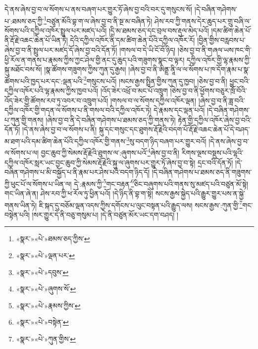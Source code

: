 དེ་ནས་ཞེས་བྱ་བ་ལ་སོགས་པ་ནས་བཞག་པར་གྱུར་ཏོ་ཞེས་བྱ་བའི་བར་དུ་གསུངས་སོ། །དེ་བཞིན་གཤེགས་པ་:ཐམས་ཅད་ཀྱི་\footnote{«སྣར་»«པེ་»ཐམས་ཅད་ཀྱིས་}བཙུན་མོའི་བྷ་ག་ལ་ཞེས་བྱ་བ་ནི་སྔ་མ་བཞིན་ཏེ། ཤེས་རབ་ཀྱི་གནས་དེར་ཆུད་པར་གྲུ་བཞི་ལ་སོགས་པའི་དཀྱིལ་འཁོར་སྤྲུལ་པར་མཛད་པའོ། །དྲི་མ་ཐམས་ཅད་དང་བྲལ་བས་རྡུལ་མེད་པའོ། །དམ་ཚིག་ཆེན་པོ་ནི་རྡོ་རྗེ་འཆང་ཆེན་པོ་ཡིན་ཏེ། དེའི་དཀྱིལ་འཁོར་ནི་དམ་ཚིག་ཆེན་པོའི་དཀྱིལ་འཁོར་རོ། །བྱིན་གྱིས་བརླབས་པ་ཞེས་བྱ་བ་ནི་སྤྲུལ་པར་མཛད་དོ་ཞེས་བྱ་བའི་དོན་ཏོ། །གསལ་བ་དེ་ཡི་ངོ་བོ་ཉིད། །ཅེས་བྱ་བ་ནི་གཞལ་ཡས་ཁང་གི་ཕྱི་རོལ་ན་གནས་པ་རྣམས་ཀྱིས་ཀྱང་ཤེལ་གྱི་ནང་དུ་ཆུད་པའི་གཟུགས་སྣང་བ་ལྟར། དཀྱིལ་འཁོར་གྱི་ལྷ་རྣམས་ཀྱི་སྐུ་མཐོང་བས་སོ། །སྣ་ཚོགས་གཟུགས་ཀྱིས་ཀུན་དུ་རྒྱས། །ཞེས་བྱ་བ་ནི་ཨིནྡྲ་ནཱི་ལ་ལ་སོགས་པ་ཁ་དོག་རྣམ་པ་སྣ་ཚོགས་པའི་ཁྱད་པར་དང་:ལྡན་པའི་\footnote{«སྣར་»«པེ་»ལྡན་པར་}གསུངས་པའོ། །སངས་རྒྱས་སྤྲིན་གྱིས་ཀུན་དུ་ཁྱབ། །ཅེས་བྱ་བ་ནི། ཕྱུང་བའི་དཀྱིལ་འཁོར་པའི་ལྷ་རྣམས་ཀྱིས་ཁྱབ་པའོ། །འོད་ཟེར་འཕྲོ་བ་མང་པོ་འཁྲུག །ཅེས་བྱ་བ་ནི་ཕྱོགས་བཅུར་ཁྲོ་བོའི་འོད་ཟེར་གྱི་ཚོགས་རབ་ཏུ་འབར་བ་འཁྲུག་པའོ། །གསལ་བ་ལ་སོགས་དཀྱིལ་འཁོར་ལྡན། །ཞེས་བྱ་བ་ནི་ཟླ་བའི་དཀྱིལ་འཁོར་གྱི་གདན་ལ་སོགས་པ་ནི་གསལ་བའི་དཀྱིལ་འཁོར་ཏེ། དེ་རྣམས་དང་ལྡན་པའོ། །དེ་བཞིན་གཤེགས་པ་ཀུན་གྱི་གནས། །ཞེས་བྱ་བ་ནི་དེ་བཞིན་གཤེགས་པ་ཐམས་ཅད་ཀྱི་གནས་ཏེ། རྟེན་གྱི་དཀྱིལ་འཁོར་ཞེས་བྱ་བའི་དོན་ཏོ། །དེ་ནས་ཞེས་བྱ་བ་ལ་སོགས་པ་ནི། སྐུ་དང་གསུང་དང་ཐུགས་རྡོ་རྗེའི་བདག་པོ་རྡོ་རྗེ་འཆང་ཆེན་པོ་དེ་བཤད་མ་ཐག་པའི་དམ་ཚིག་ཆེན་པོའི་དཀྱིལ་འཁོར་གྱི་གནས་\footnote{«སྣར་»«པེ་»དབུས་}སུ་བདག་ཉིད་བཞག་པར་གྱུར་བའོ། །དེ་ནས་ཞེས་བྱ་བ་ལ་སོགས་པ་ལ། བྱང་ཆུབ་ཀྱི་སེམས་རྡོ་རྗེའི་ཐུགས་ལ་:ཞུགས་པའོ་\footnote{«སྣར་»«པེ་»ཞུགས་སོ་}ཞེས་བྱ་བ་ནི། རིགས་ལྔས་བསྡུས་པའི་ལྷའི་དཀྱིལ་འཁོར་སླར་ཡང་བྱང་ཆུབ་ཀྱི་སེམས་རྡོ་རྗེའི་སྐུ་ལ་ཞུགས་པར་གྱུར་ཏོ་ཞེས་བྱ་བ་སྟེ། དྲང་བའི་དོན་ཏོ། །དེ་བཞིན་གཤེགས་པ་མི་བསྐྱོད་པ་ནི་རྣམ་པར་ཤེས་པའི་བདག་ཉིད་དོ། །དེ་བཞིན་གཤེགས་པ་ཐམས་ཅད་ནི་གཟུགས་ཀྱི་ཕུང་པོ་ལ་སོགས་པ་ཡིན་ལ། དེ་:རྣམས་ཀྱི་\footnote{«སྣར་»«པེ་»རྣམས་ཀྱིས་}གང་བརྟན་\footnote{«སྣར་»«པེ་»བསྟེན་}ཅིང་བཞུགས་པའི་གནས་སུ་མཛད་པའི་བཙུན་མོ་སྟེ། གང་ཡིན་ཞེ་ན། ཤེས་རབ་ཀྱི་ཕ་རོལ་ཏུ་ཕྱིན་པའོ། །དེ་ཉིད་ནི་བྷ་ག་སྟེ། སངས་རྒྱས་སྐྱེད་པའི་རྒྱུར་གྱུར་པས་ན་སྐྱེ་གནས་ཡིན་ཏེ། ཇི་སྐད་དུ་བཅོམ་ལྡན་འདས་ཀྱིས་དགོངས་པ་ལུང་བསྟན་པའི་རྒྱུད་ལས། སངས་རྒྱས་:ཀུན་གྱི་\footnote{«སྣར་»«པེ་»ཀུན་གྱིས་}གང་བསྟེན་པའི། །སར་གྱུར་དེ་ནི་བཅུ་གསུམ་པ། །དེ་ནི་བཙུན་མོར་ཡང་དག་བཤད། །
